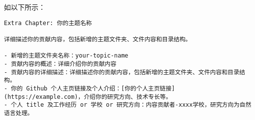 \documentclass[
]{article}
\begin{document}
如以下所示：

\begin{verbatim}
Extra Chapter: 你的主题名称

详细描述你的贡献内容，包括新增的主题文件夹、文件内容和目录结构。

- 新增的主题文件夹名称：your-topic-name
- 贡献内容的概述：详细介绍你的贡献内容
- 贡献内容的详细描述：详细描述你的贡献内容，包括新增的主题文件夹、文件内容和目录结构。
- 你的 Github 个人主页链接及个人介绍：[你的个人主页链接](https://example.com)，介绍你的研究方向、技术专长等。
- 个人 title 及工作经历 or 学校 or 研究方向：内容贡献者-xxxx学校，研究方向为自然语言处理。
\end{verbatim}
\end{document}
